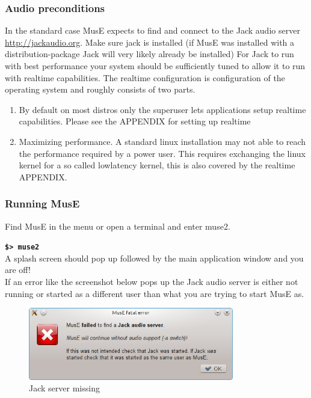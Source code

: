 \documentclass[a4paper]{report}
\newcommand{\shell}[1]{\texttt{\textbf{#1}}}
\newcommand{\screenshotwidth}[0]{0.8\textwidth}
\begin{document}
\subsubsection{Audio preconditions}
In the standard case MusE expects to find and connect to the Jack audio
server \url{http://jackaudio.org}. Make sure jack is installed (if MusE was
installed with a distribution-package Jack will very likely already be
installed) For Jack to run with best performance your system should be
sufficiently tuned to allow it to run with realtime capabilities. The
realtime configuration is configuration of the operating system and roughly
consists of two parts.
\begin{enumerate}
\item By default on most distros only the superuser lets applications setup
realtime capabilities. Please see the APPENDIX for setting up realtime 
\item Maximizing performance. A standard linux installation may not able
to reach the performance required by a power user. This requires exchanging
the linux kernel for a so called lowlatency kernel, this is also covered by
the realtime APPENDIX.
\end{enumerate}

\subsubsection{Running MusE}
Find MusE in the menu or open a terminal and enter muse2.

\shell{\$> muse2}\\A splash screen should pop up followed
by the main application window and you are off!\\
If an error like the screenshot below pops up the Jack audio server is
either not running or started as a different user than what you are trying
to start MusE as.
\begin{figure}[htp]
\centering \includegraphics[width=\screenshotwidth]{pics/no_audio} 
\caption{Jack server missing}
\label{fig:no_audio} 
\end{figure}
\end{document}
